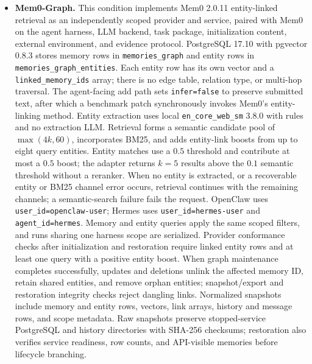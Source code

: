 \documentclass[letterpaper]{article}
\begin{document}
\begin{itemize}
    \item \textbf{Mem0-Graph.} This condition implements Mem0 2.0.11 entity-linked retrieval as an independently scoped provider and service, paired with Mem0 on the agent harness, LLM backend, task package, initialization content, external environment, and evidence protocol. PostgreSQL 17.10 with pgvector 0.8.3 stores memory rows in \texttt{memories\_graph} and entity rows in \texttt{memories\_graph\_entities}. Each entity row has its own vector and a \texttt{linked\_memory\_ids} array; there is no edge table, relation type, or multi-hop traversal. The agent-facing add path sets \texttt{infer=false} to preserve submitted text, after which a benchmark patch synchronously invokes Mem0's entity-linking method. Entity extraction uses local \texttt{en\_core\_web\_sm} 3.8.0 with rules and no extraction LLM. Retrieval forms a semantic candidate pool of \(\max(4k,60)\), incorporates BM25, and adds entity-link boosts from up to eight query entities. Entity matches use a \(0.5\) threshold and contribute at most a \(0.5\) boost; the adapter returns \(k=5\) results above the \(0.1\) semantic threshold without a reranker. When no entity is extracted, or a recoverable entity or BM25 channel error occurs, retrieval continues with the remaining channels; a semantic-search failure fails the request. OpenClaw uses \texttt{user\_id=openclaw-user}; Hermes uses \texttt{user\_id=hermes-user} and \texttt{agent\_id=hermes}. Memory and entity queries apply the same scoped filters, and runs sharing one harness scope are serialized. Provider conformance checks after initialization and restoration require linked entity rows and at least one query with a positive entity boost. When graph maintenance completes successfully, updates and deletions unlink the affected memory ID, retain shared entities, and remove orphan entities; snapshot/export and restoration integrity checks reject dangling links. Normalized snapshots include memory and entity rows, vectors, link arrays, history and message rows, and scope metadata. Raw snapshots preserve stopped-service PostgreSQL and history directories with SHA-256 checksums; restoration also verifies service readiness, row counts, and API-visible memories before lifecycle branching.


\end{itemize}
\end{document}
